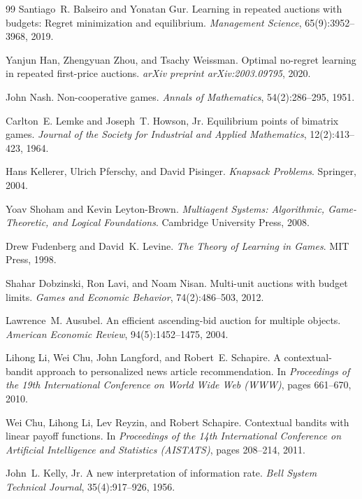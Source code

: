 \documentclass{article}
\theoremstyle{definition}
\theoremstyle{remark}
\begin{document}
\begin{thebibliography}{99}
Santiago~R. Balseiro and Yonatan Gur.
\newblock Learning in repeated auctions with budgets: Regret minimization and equilibrium.
\newblock \emph{Management Science}, 65(9):3952--3968, 2019.

Yanjun Han, Zhengyuan Zhou, and Tsachy Weissman.
\newblock Optimal no-regret learning in repeated first-price auctions.
\newblock \emph{arXiv preprint arXiv:2003.09795}, 2020.

John Nash.
\newblock Non-cooperative games.
\newblock \emph{Annals of Mathematics}, 54(2):286--295, 1951.

Carlton~E. Lemke and Joseph~T. Howson, Jr.
\newblock Equilibrium points of bimatrix games.
\newblock \emph{Journal of the Society for Industrial and Applied Mathematics}, 12(2):413--423, 1964.

Hans Kellerer, Ulrich Pferschy, and David Pisinger.
\newblock \emph{Knapsack Problems}.
\newblock Springer, 2004.

Yoav Shoham and Kevin Leyton-Brown.
\newblock \emph{Multiagent Systems: Algorithmic, Game-Theoretic, and Logical Foundations}.
\newblock Cambridge University Press, 2008.

Drew Fudenberg and David~K. Levine.
\newblock \emph{The Theory of Learning in Games}.
\newblock MIT Press, 1998.

Shahar Dobzinski, Ron Lavi, and Noam Nisan.
\newblock Multi-unit auctions with budget limits.
\newblock \emph{Games and Economic Behavior}, 74(2):486--503, 2012.

Lawrence~M. Ausubel.
\newblock An efficient ascending-bid auction for multiple objects.
\newblock \emph{American Economic Review}, 94(5):1452--1475, 2004.

Lihong Li, Wei Chu, John Langford, and Robert~E. Schapire.
\newblock A contextual-bandit approach to personalized news article recommendation.
\newblock In \emph{Proceedings of the 19th International Conference on World Wide Web (WWW)}, pages 661--670, 2010.

Wei Chu, Lihong Li, Lev Reyzin, and Robert Schapire.
\newblock Contextual bandits with linear payoff functions.
\newblock In \emph{Proceedings of the 14th International Conference on Artificial Intelligence and Statistics (AISTATS)}, pages 208--214, 2011.

John~L. Kelly, Jr.
\newblock A new interpretation of information rate.
\newblock \emph{Bell System Technical Journal}, 35(4):917--926, 1956.

\end{thebibliography}
\end{document}
